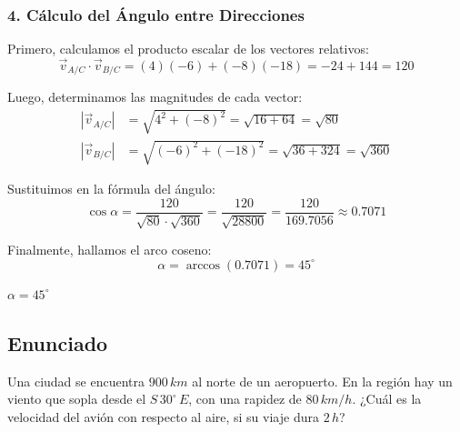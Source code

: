 \documentclass[12pt, a4paper]{article}
\begin{document}
\subsubsection*{4. Cálculo del Ángulo entre Direcciones}

Primero, calculamos el producto escalar de los vectores relativos:
\begin{equation}
    \vec{v}_{A/C} \cdot \vec{v}_{B/C} = (4)(-6) + (-8)(-18) = -24 + 144 = 120
\end{equation}

Luego, determinamos las magnitudes de cada vector:
\begin{align*}
    |\vec{v}_{A/C}| &= \sqrt{4^2 + (-8)^2} = \sqrt{16 + 64} = \sqrt{80} \\
    |\vec{v}_{B/C}| &= \sqrt{(-6)^2 + (-18)^2} = \sqrt{36 + 324} = \sqrt{360}
\end{align*}

Sustituimos en la fórmula del ángulo:
\begin{equation}
    \cos \alpha = \frac{120}{\sqrt{80} \cdot \sqrt{360}} = \frac{120}{\sqrt{28800}} = \frac{120}{169.7056} \approx 0.7071
\end{equation}

Finalmente, hallamos el arco coseno:
\begin{equation}
    \alpha = \arccos(0.7071) = 45^\circ
\end{equation}

\begin{tcolorbox}[colback=green!5!white, colframe=green!50!black, title=Respuesta Final]
\centering \Large $\alpha = 45^\circ$
\end{tcolorbox}

\newpage

\subsection*{Enunciado}

Una ciudad se encuentra $900 \, \si{km}$ al norte de un aeropuerto. En la región hay un viento que sopla desde el $S \, 30^\circ \, E$, con una rapidez de $80 \, \si{km/h}$. ¿Cuál es la velocidad del avión con respecto al aire, si su viaje dura $2 \, \si{h}$?
\end{document}
